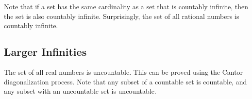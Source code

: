 \documentclass[a4paper]{report}
\begin{document}
Note that if a set has the same cardinality as a set that is countably infinite, then the set is
also countably infinite. Surprisingly, the set of all rational numbers is countably infinite.

\subsection{Larger Infinities}

The set of all real numbers is uncountable. This can be proved using the Cantor diagonalization process.
Note that any subset of a countable set is countable, and any subset with an uncountable set is uncountable.
\end{document}
